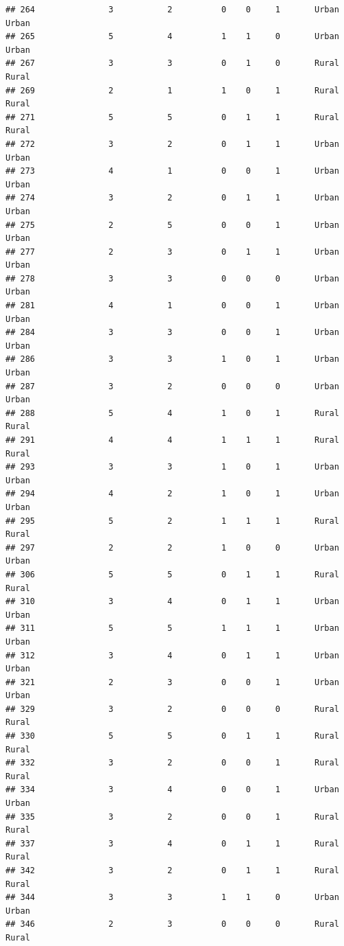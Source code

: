 \documentclass[
]{article}
\begin{document}
\begin{verbatim}
## 264               3           2          0    0     1       Urban Urban
## 265               5           4          1    1     0       Urban Urban
## 267               3           3          0    1     0       Rural Rural
## 269               2           1          1    0     1       Rural Rural
## 271               5           5          0    1     1       Rural Rural
## 272               3           2          0    1     1       Urban Urban
## 273               4           1          0    0     1       Urban Urban
## 274               3           2          0    1     1       Urban Urban
## 275               2           5          0    0     1       Urban Urban
## 277               2           3          0    1     1       Urban Urban
## 278               3           3          0    0     0       Urban Urban
## 281               4           1          0    0     1       Urban Urban
## 284               3           3          0    0     1       Urban Urban
## 286               3           3          1    0     1       Urban Urban
## 287               3           2          0    0     0       Urban Urban
## 288               5           4          1    0     1       Rural Rural
## 291               4           4          1    1     1       Rural Rural
## 293               3           3          1    0     1       Urban Urban
## 294               4           2          1    0     1       Urban Urban
## 295               5           2          1    1     1       Rural Rural
## 297               2           2          1    0     0       Urban Urban
## 306               5           5          0    1     1       Rural Rural
## 310               3           4          0    1     1       Urban Urban
## 311               5           5          1    1     1       Urban Urban
## 312               3           4          0    1     1       Urban Urban
## 321               2           3          0    0     1       Urban Urban
## 329               3           2          0    0     0       Rural Rural
## 330               5           5          0    1     1       Rural Rural
## 332               3           2          0    0     1       Rural Rural
## 334               3           4          0    0     1       Urban Urban
## 335               3           2          0    0     1       Rural Rural
## 337               3           4          0    1     1       Rural Rural
## 342               3           2          0    1     1       Rural Rural
## 344               3           3          1    1     0       Urban Urban
## 346               2           3          0    0     0       Rural Rural

\end{verbatim}
\end{document}
